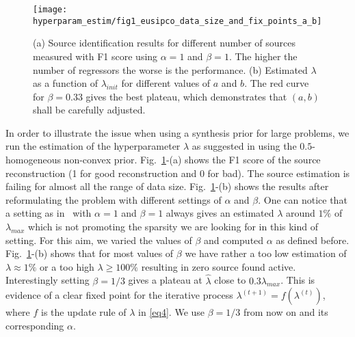 \begin{figure}
	\texttt{[image: hyperparam\_estim/fig1\_eusipco\_data\_size\_and\_fix\_points\_a\_b]}
    \caption{(a) Source identification results for different number of sources measured with F1 score
    using $\alpha=1$ and $\beta=1$. The higher the number of regressors the worse is the performance.
    (b) Estimated $\lambda$ as a function of $\lambda_{init}$ for different values of $a$ and $b$.
    The red curve for $\beta=0.33$ gives the best plateau, which demonstrates that $(a,b)$
    shall be carefully adjusted.
    }
    \label{fig:fig1}
\end{figure}

In order to illustrate the issue when using a synthesis prior for large problems, we run the estimation of the hyperparameter $\lambda$ as suggested in \cite{Figueiredo} using the $0.5$-homogeneous non-convex prior. Fig.~\ref{fig:fig1}-(a) shows the F1 score of the source reconstruction (1 for good reconstruction and 0 for bad). The source estimation is failing for almost all the range of data size. Fig.~\ref{fig:fig1}-(b) shows the results after reformulating the problem with different settings of $\alpha$ and $\beta$. One can notice that a setting as in~\cite{Figueiredo} with $\alpha=1$ and $\beta=1$ always gives an estimated $\lambda$ around $1\%$ of $\lambda_{max}$ which is not promoting the sparsity we are looking for in this kind of setting. For this aim, we varied the values of $\beta$ and computed $\alpha$ as defined before. Fig.~\ref{fig:fig1}-(b) shows that for most values of $\beta$ we have rather a too low estimation of $\lambda\approx 1\%$ or a too high $\lambda\geq 100\%$ resulting in zero source found active. Interestingly setting $\beta=1/3$ gives a plateau at $\hat{\lambda}$ close to $0.3\lambda_{max}$. This is evidence of a clear fixed point for the iterative process $\lambda^{(t+1)}=f(\lambda^{(t)})$, where $f$ is the update rule of $\lambda$ in \eqref{eq4}. We use $\beta=1/3$ from now on and its corresponding $\alpha$.

